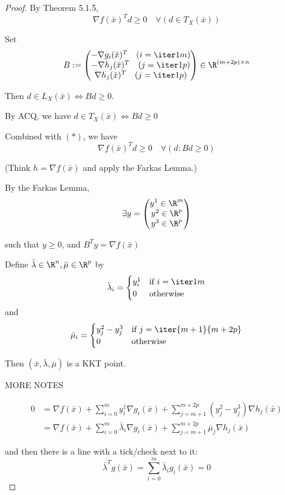 \begin{proof}
	\def\bm{\bar\mu}\def\bl{\bar\lambda}\def\bx{\bar x}
	By Theorem 5.1.5,
	\begin{equation*}
		\nabla f(\bx)^Td\geq0\quad\forall(d\in T_X(\bx))\tag*{($*$)}
	\end{equation*}

	Set
	$$
		B:=\begin{pmatrix}
			-\nabla g_i(\bx)^T\quad(i=\iter1m) \\
			-\nabla h_j(\bx)^T\quad(j=\iter1p) \\
			\nabla h_j(\bx)^T\quad(j=\iter1p)
		\end{pmatrix}\in\R^{(m+2p)\times{n}}
	$$

	Then $d\in L_X(\bx)\iff Bd\geq0$.

	By ACQ, we have $d\in T_X(\bx)\iff Bd\geq0$

	Combined with $(*)$, we have
	$$
		\nabla f(\bx)^Td\geq0\quad\forall(d:Bd\geq0)
	$$

	(Think $h=\nabla f(\bx)$ and apply the Farkas Lemma.)

	By the Farkas Lemma,
	$$
		\exists y=\begin{pmatrix}y^1\in\R^m\\y^2\in\R^p\\y^3\in\R^p\end{pmatrix}
	$$

	such that $y\geq0$, and $B^Ty=\nabla f(\bx)$

	Define $\bl\in\R^n,\bm\in\R^p$ by
	$$
		\bl_i=\begin{cases}
			y^1_i & \text{if $i=\iter1m$} \\
			0     & \text{otherwise}
		\end{cases}
	$$
	and
	$$
		\bm_i=\begin{cases}
			y^2_j - y^3_j & \text{if $j=\iter{m+1}{m+2p}$} \\
			0             & \text{otherwise}
		\end{cases}
	$$

	Then $(\bx,\bl,\bm)$ is a KKT point.

	MORE NOTES

	\begin{align*}
		0
		 & = \nabla f(\bx)
		+\sum_{i=0}^my^1_i\nabla g_i(\bx)
		+\sum_{j=m+1}^{m+2p}(y^2_j-y^3_j)\nabla h_j(\bx) \\
		 & = \nabla f(\bx)
		+\sum_{i=0}^m \bl_i\nabla g_i(\bx)
		+\sum_{j=m+1}^{m+2p}\bm_j\nabla h_j(\bx)
	\end{align*}

	and then there is a line with a tick/check next to it:
	$$
		\bl^Tg(\bx)=\sum_{i=0}^m\bl_ig_i(\bx)=0
	$$
\end{proof}

